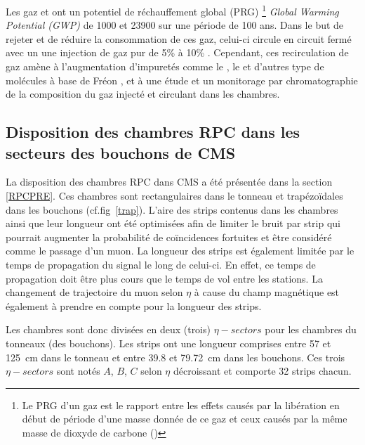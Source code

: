 Les gaz  et  ont un  potentiel de réchauffement global (PRG) \footnote{Le PRG d’un gaz est le rapport entre les effets causés par la libération en début de période d’une masse donnée de ce gaz et ceux causés par la même masse de dioxyde de carbone ()} \textit{Global Warming Potential (GWP)} de \num{1000} et \num{23900} sur une période de \num{100} ans. Dans le but de rejeter et de réduire la consommation de ces gaz, celui-ci circule en circuit fermé avec un une injection de gaz pur de \num{5}\% à \num{10}\% \cite{5401780}. Cependant, ces recirculation de gaz amène à l'augmentation d'impuretés comme le , le  et d'autres type de molécules à base de Fréon \cite{1748-0221-8-08-T08003}, et à une étude et un monitorage par chromatographie de la composition du gaz injecté et circulant dans les chambres. 

\subsection{Disposition des chambres RPC dans les secteurs des bouchons de CMS}
\vspace{-0.2cm}
La disposition des chambres RPC dans CMS a été présentée dans la section \ref{RPCPRE}. Ces chambres sont rectangulaires dans le tonneau et trapézoïdales dans les bouchons (cf.fig~\ref{trap}). L'aire des strips contenus dans les chambres ainsi que leur longueur ont été optimisées afin de limiter le bruit par strip qui pourrait augmenter la probabilité de coïncidences fortuites et être considéré comme le passage d'un muon. La longueur des strips est également limitée par le temps de propagation du signal le long de celui-ci. En effet, ce temps de propagation doit être plus cours que le temps de vol entre les stations. La changement de trajectoire du muon selon $\eta$ à cause du champ magnétique est également à prendre en compte pour la longueur des strips.

Les chambres sont donc divisées en deux (trois) $\eta-sectors$ pour les chambres du tonneaux (des bouchons). Les strips ont une longueur comprises entre \num{57} et \SI{125}{\centi\meter} dans le tonneau et entre \num{39.8} et \SI{79.72}{\centi\meter} dans les bouchons. Ces trois $\eta-sectors$ sont notés $A$, $B$, $C$ selon $\eta$ décroissant et comporte \num{32} strips chacun.


